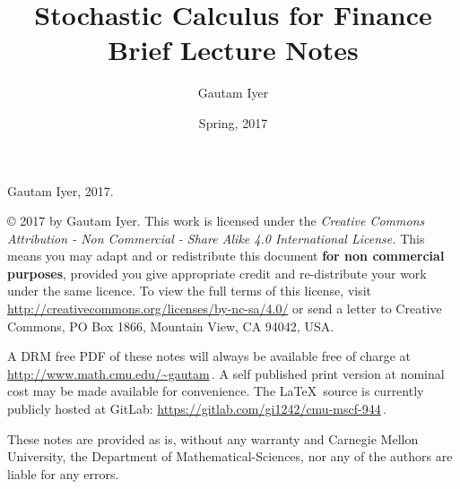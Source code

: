 
\frontmatter
\title{Stochastic Calculus for Finance\\Brief Lecture Notes}
\author{Gautam Iyer}
\date{Spring, 2017}
\hypersetup{pageanchor=false}
\maketitle%
\begingroup\tiny

\noindent%
Gautam Iyer, 2017.
\bigskip

\copyright{} 2017 by Gautam Iyer.
This work is licensed under the \emph{Creative Commons Attribution - Non Commercial - Share Alike 4.0 International License.}
This means you may adapt and or redistribute this document \textbf{for non commercial purposes}, provided you give appropriate credit and re-distribute your work under the same licence.
To view the full terms of this license, visit
  \url{http://creativecommons.org/licenses/by-nc-sa/4.0/}
or send a letter to Creative Commons, PO Box 1866, Mountain View, CA 94042, USA.

A DRM free PDF of these notes will always be available free of charge at \url{http://www.math.cmu.edu/~gautam}\,.
A self published print version at nominal cost may be made available for convenience.
The \LaTeX\ source is currently publicly hosted at GitLab: \url{https://gitlab.com/gi1242/cmu-mscf-944}\,.
\bigskip

These notes are provided as is, without any warranty and Carnegie Mellon University, the Department of Mathematical-Sciences, nor any of the authors are liable for any errors.

